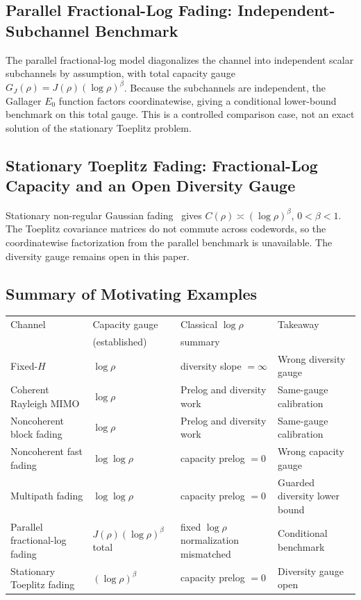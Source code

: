 \documentclass[lettersize,onecolumn]{IEEEtran}
\newcommand{\snr}{\rho}
\begin{document}
\subsection{Parallel Fractional-Log Fading: Independent-Subchannel Benchmark}
\label{subsec:int_parallel}

The parallel fractional-log model diagonalizes the channel into
independent scalar subchannels by assumption, with total capacity
gauge $G_J(\snr)=J(\snr)(\log\snr)^\beta$. Because the subchannels
are independent, the Gallager $E_0$ function factors coordinatewise,
giving a conditional lower-bound benchmark on this total gauge. This
is a controlled comparison case, not an exact solution of the
stationary Toeplitz problem.

\subsection{Stationary Toeplitz Fading: Fractional-Log Capacity and an Open Diversity Gauge}
\label{subsec:int_toeplitz}

Stationary non-regular Gaussian fading~\cite{Lapidoth2005} gives
$C(\snr) \asymp (\log\snr)^\beta$, $0<\beta<1$. The Toeplitz
covariance matrices do not commute across codewords, so the
coordinatewise factorization from the parallel benchmark is
unavailable. The diversity gauge remains open in this paper.

\subsection{Summary of Motivating Examples}

\begin{center}
\small
\begin{tabular}{@{}llll@{}}
\toprule
Channel & Capacity gauge & Classical $\log\snr$ & Takeaway \\
& (established) & summary & \\
\midrule
Fixed-$H$ & $\log\snr$ & diversity slope $= \infty$ & Wrong diversity gauge \\
Coherent Rayleigh MIMO & $\log\snr$ & Prelog and diversity work & Same-gauge calibration \\
Noncoherent block fading & $\log\snr$ & Prelog and diversity work & Same-gauge calibration \\
Noncoherent fast fading & $\log\log\snr$ & capacity prelog $= 0$ & Wrong capacity gauge \\
Multipath fading & $\log\log\snr$ & capacity prelog $= 0$ & Guarded diversity lower bound \\
Parallel fractional-log fading & $J(\snr)(\log\snr)^\beta$ total & fixed $\log\snr$ normalization mismatched & Conditional benchmark \\
Stationary Toeplitz fading & $(\log\snr)^\beta$ & capacity prelog $= 0$ & Diversity gauge open \\
\bottomrule
\end{tabular}
\end{center}
\end{document}
